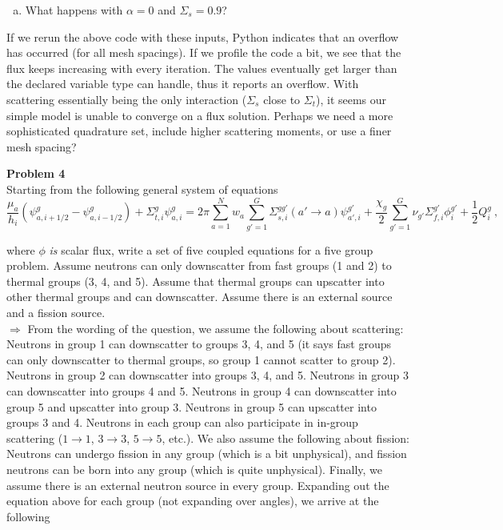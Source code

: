 \documentclass[10pt]{article}
\begin{document}
%
%
%

\vspace{10pt}
\begin{enumerate}[(d)]
\item What happens with $\alpha = 0$ and $\Sigma_s = 0.9$?
\end{enumerate}

If we rerun the above code with these inputs, Python indicates that an overflow has occurred (for all mesh spacings). If we profile the code a bit, we see that the flux keeps increasing with every iteration. The values eventually get larger than the declared variable type can handle, thus it reports an overflow. With scattering essentially being the only interaction ($\Sigma_s$ close to $\Sigma_t$), it seems our simple model is unable to converge on a flux solution. Perhaps we need a more sophisticated quadrature set, include higher scattering moments, or use a finer mesh spacing? 





\newpage
\noindent \textbf{Problem 4}\\
Starting from the following general system of equations
%
\begin{equation*}
\frac{\mu_a}{h_i}(\psi_{a,i+1/2}^g - \psi_{a,i-1/2}^g)+ \Sigma_{t,i}^g\psi_{a,i}^g = 2\pi\sum_{a=1}^N w_a \sum_{g'=1}^G \Sigma_{s, i}^{gg'}(a'\rightarrow a)\psi_{a',i}^{g'} + \frac{\chi_g}{2}\sum_{g'=1}^G \nu_{g'}\Sigma_{f,i}^{g'} \phi_{i}^{g'} + \frac{1}{2}Q_i^g\:,
\end{equation*}

where  $\phi$ \textit{is} scalar flux, write a set of five coupled equations for a five group problem. Assume neutrons can only downscatter from fast groups (1 and 2) to thermal groups (3, 4, and 5). Assume that thermal groups can upscatter into other thermal groups and can downscatter. Assume there is an external source and a fission source.\\

$\Rightarrow$ From the wording of the question, we assume the following about scattering: Neutrons in group 1 can downscatter to groups 3, 4, and 5 (it says fast groups can only downscatter to thermal groups, so group 1 cannot scatter to group 2). Neutrons in group 2 can downscatter into groups 3, 4, and 5. Neutrons in group 3 can downscatter into groups 4 and 5. Neutrons in group 4 can downscatter into group 5 and upscatter into group 3. Neutrons in group 5 can upscatter into groups 3 and 4. Neutrons in each group can also participate in in-group scattering ($1\rightarrow1$, $3\rightarrow3$, $5\rightarrow5$, etc.). We also assume the following about fission: Neutrons can undergo fission in any group (which is a bit unphysical), and fission neutrons can be born into any group (which is quite unphysical). Finally, we assume there is an external neutron source in every group. Expanding out the equation above for each group (not expanding over angles), we arrive at the following \\
\end{document}
